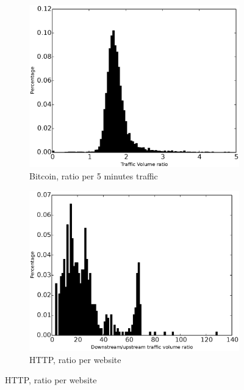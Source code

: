 \begin{figure}
\centering
\begin{subfigure}{0.32\linewidth}
\includegraphics[width=\linewidth]{image/ratio_downstream_upstream_traffic_volume_bitcoin.eps}
\caption{Bitcoin, ratio per 5 minutes traffic}
\label{fig:ratio_downstream_upstream_traffic_volume_bitcoin}
\end{subfigure}
\begin{subfigure}{0.32\linewidth}
\includegraphics[width=\linewidth]{image/ratio_downstream_upstream_traffic_volume_http.eps}
\caption{HTTP, ratio per website}
\label{fig:ratio_downstream_upstream_traffic_volume_http}
\end{subfigure}

\end{figure}

